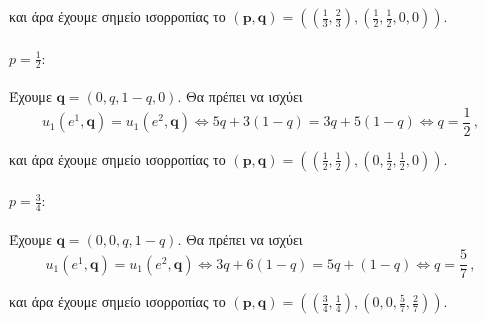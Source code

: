 και άρα έχουμε σημείο ισορροπίας το
$(\textbf{p}, \textbf{q}) = \left((\frac{1}{3}, \frac{2}{3}), \left(\frac{1}{2}, \frac{1}{2}, 0, 0\right)\right)$.

\paragraph{$p = \frac{1}{2}:$}
Έχουμε $\textbf{q} = (0, q, 1 - q, 0)$. Θα πρέπει να ισχύει
$$
    u_1(e^1, \textbf{q}) = u_1(e^2, \textbf{q}) \Leftrightarrow
    5q + 3 (1 - q) = 3q + 5 (1 - q) \Leftrightarrow
    q = \frac{1}{2} \,,
$$

και άρα έχουμε σημείο ισορροπίας το
$(\textbf{p}, \textbf{q}) = \left((\frac{1}{2}, \frac{1}{2}), \left(0, \frac{1}{2}, \frac{1}{2}, 0\right)\right)$.

\paragraph{$p = \frac{3}{4}:$}
Έχουμε $\textbf{q} = (0, 0, q, 1 - q)$. Θα πρέπει να ισχύει
$$
    u_1(e^1, \textbf{q}) = u_1(e^2, \textbf{q}) \Leftrightarrow
    3q + 6 (1 - q) = 5q + (1 - q) \Leftrightarrow
    q = \frac{5}{7} \,,
$$

και άρα έχουμε σημείο ισορροπίας το
$(\textbf{p}, \textbf{q}) = \left((\frac{3}{4}, \frac{1}{4}), \left(0, 0, \frac{5}{7}, \frac{2}{7}\right)\right)$.
